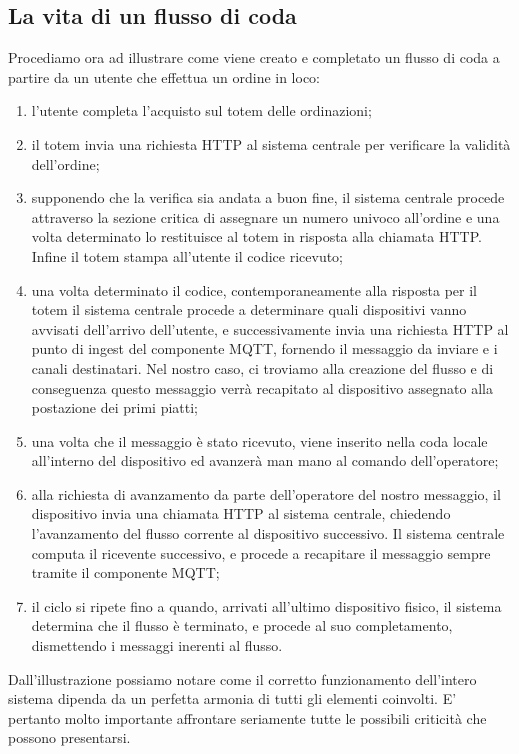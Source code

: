 \documentclass[a4paper, titlepage, 12pt, openright, oneside]{book}
\begin{document}
\subsection{La vita di un flusso di coda}
Procediamo ora ad illustrare come viene creato e completato un flusso di coda a partire da un utente che effettua un ordine in loco:
\begin{enumerate}
	\item l'utente completa l'acquisto sul totem delle ordinazioni;
	\item il totem invia una richiesta HTTP al sistema centrale per verificare la validità dell'ordine;
	\item supponendo che la verifica sia andata a buon fine, il sistema centrale procede attraverso la sezione critica di assegnare un numero univoco all'ordine
		  e una volta determinato lo restituisce al totem in risposta alla chiamata HTTP. Infine il totem stampa all'utente il codice ricevuto;
	\item una volta determinato il codice, contemporaneamente alla risposta per il totem il sistema centrale procede a determinare quali dispositivi vanno avvisati dell'arrivo dell'utente, e successivamente invia una richiesta HTTP al punto di ingest del componente MQTT, fornendo il messaggio da inviare e i canali destinatari. Nel nostro caso, ci troviamo alla creazione del flusso e di conseguenza questo messaggio verrà recapitato al dispositivo assegnato alla postazione dei primi piatti;
	\item una volta che il messaggio è stato ricevuto, viene inserito nella coda locale all'interno del dispositivo ed avanzerà man mano al comando dell'operatore;
	\item alla richiesta di avanzamento da parte dell'operatore del nostro messaggio, il dispositivo invia una chiamata HTTP al sistema centrale, chiedendo l'avanzamento del flusso
		  corrente al dispositivo successivo. Il sistema centrale computa il ricevente successivo, e procede a recapitare il messaggio sempre tramite il componente MQTT;
	\item il ciclo si ripete fino a quando, arrivati all'ultimo dispositivo fisico, il sistema determina che il flusso è terminato, e procede al suo completamento,
		  dismettendo i messaggi inerenti al flusso. 
\end{enumerate}

Dall'illustrazione possiamo notare come il corretto funzionamento dell'intero sistema dipenda da un perfetta armonia di tutti gli elementi coinvolti. E' pertanto molto importante affrontare seriamente tutte le possibili criticità che possono presentarsi.
\end{document}

